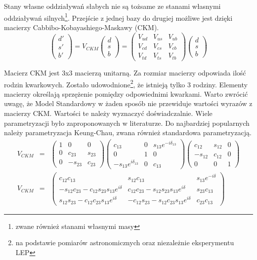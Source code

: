 Stany własne oddziaływań słabych nie są tożsame ze stanami własnymi oddziaływań silnych\footnote{zwane również stanami własnymi masy}. Przejście z jednej bazy do drugiej możliwe jest dzięki macierzy Cabbibo-Kobayashiego-Maskawy (CKM).
\begin{equation}
\begin{pmatrix}
d'\\ s' \\b'
\end{pmatrix} =V_{CKM} 
\begin{pmatrix}
d\\ s \\b
\end{pmatrix}=\begin{pmatrix}
V_{ud}& V_{us}&V_{ub}\\ V_{cd}& V_{cs}&V_{cb} \\ V_{td}& V_{ts}&V_{tb}
\end{pmatrix} \begin{pmatrix}
d\\ s \\b
\end{pmatrix}
\end{equation}

Macierz CKM jest 3x3 macierzą unitarną. Za rozmiar macierzy odpowiada ilość rodzin kwarkowych. Zostało udowodnione\footnote{na podstawie pomiarów astronomicznych oraz niezależnie eksperymentu LEP}, że istnieją tylko 3 rodziny. Elementy macierzy określają sprzężenie pomiędzy odpowiednimi kwarkami. Warto zwrócić uwagę, że Model Standardowy w żaden sposób nie przewiduje wartości wyrazów z macierzy CKM. Wartości te należy wyznaczyć doświadczalnie. 
Wiele parametryzacji było zaproponowanych w literaturze. Do najbardziej popularnych należy parametryzacja Keung-Chau, zwana również standardowa parametryzacją. 
\begin{eqnarray}
V_{CKM}&=&\begin{pmatrix} 1 & 0 & 0 \\ 0 & c_{23} & s_{23} \\ 0 & -s_{23} & c_{23} \end{pmatrix}
 \begin{pmatrix} c_{13} & 0 & s_{13}e^{-i\delta_{13}} \\ 0 & 1 & 0 \\ -s_{13}e^{i\delta_{13}} & 0 & c_{13} \end{pmatrix}
 \begin{pmatrix} c_{12} & s_{12} & 0 \\ -s_{12} & c_{12} & 0 \\ 0 & 0 & 1 \end{pmatrix} \nonumber \\
V_{CKM}&=&\begin{pmatrix}
c_{12}c_{13}&s_{12}c_{13}& s_{13}e^{-i\delta} \\
 -s_{12}c_{23}-c_{12}s_{23}s_{13}e^{i\delta} & c_{12}c_{23}-s_{12}s_{23}s_{13}e^{i\delta}  & s_{23}c_{13}\\ s_{12}s_{23}-c_{12}c_{23}s_{13}e^{i\delta} & -c_{12}s_{23}-s_{12}c_{23}s_{13}e^{i\delta} & c_{23}c_{13}
\end{pmatrix}
\end{eqnarray}

